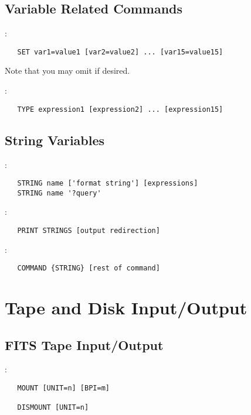 \subsection{Variable Related Commands}

:
\begin{verbatim}
   SET var1=value1 [var2=value2] ... [var15=value15]
\end{verbatim}
Note that you may omit  if desired.

\noindent {}:
\begin{verbatim}
   TYPE expression1 [expression2] ... [expression15]
\end{verbatim}

\subsection{String Variables}

:
\begin{verbatim}
   STRING name ['format string'] [expressions]
   STRING name '?query'
\end{verbatim}

\noindent {}:
\begin{verbatim}
   PRINT STRINGS [output redirection]
\end{verbatim}

\noindent {}:
\begin{verbatim}
   COMMAND {STRING} [rest of command]
\end{verbatim}


\section{Tape and Disk Input/Output}

\subsection{FITS Tape Input/Output}

:
\begin{verbatim}
   MOUNT [UNIT=n] [BPI=m]

   DISMOUNT [UNIT=n]
\end{verbatim}

